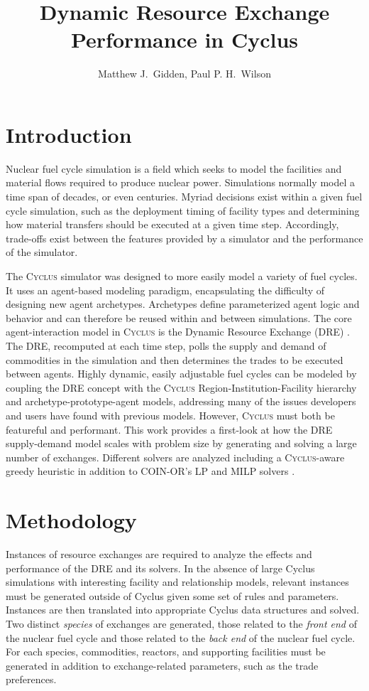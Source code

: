 \documentclass{anstrans}
\title{Dynamic Resource Exchange Performance in Cyclus}
\author{Matthew J.~Gidden, Paul P. H.~Wilson}
\institute{
University of Wisconsin, Madison WI
}
\newcommand{\Cyclus}{\textsc{Cyclus}}
\begin{document}
\section{Introduction}

Nuclear fuel cycle simulation is a field which seeks to model the facilities and
material flows required to produce nuclear power. Simulations normally model a
time span of decades, or even centuries. Myriad decisions exist within a given
fuel cycle simulation, such as the deployment timing of facility types and
determining how material transfers should be executed at a given time
step. Accordingly, trade-offs exist between the features provided by a simulator
and the performance of the simulator.

The \Cyclus{} simulator \cite{cyclus2014} was designed to more easily model a
variety of fuel cycles. It uses an agent-based modeling paradigm, encapsulating
the difficulty of designing new agent archetypes. Archetypes define
parameterized agent logic and behavior and can therefore be reused within and
between simulations. The core agent-interaction model in \Cyclus{} is the
Dynamic Resource Exchange (DRE) \cite{gidden_agent-based_2013,
  gidden_agent-based_2014}. The DRE, recomputed at each time step, polls the
supply and demand of commodities in the simulation and then determines the
trades to be executed between agents. Highly dynamic, easily adjustable fuel
cycles can be modeled by coupling the DRE concept with the \Cyclus{}
Region-Institution-Facility hierarchy and archetype-prototype-agent models,
addressing many of the issues developers and users have found with previous
models. However, \Cyclus{} must both be featureful and performant. This work
provides a first-look at how the DRE supply-demand model scales with problem
size by generating and solving a large number of exchanges. Different solvers
are analyzed including a \Cyclus{}-aware greedy heuristic in addition to
COIN-OR's LP and MILP solvers \cite{coinclp, coincbc}.

\section{Methodology}

Instances of resource exchanges are required to analyze the effects and
performance of the DRE and its solvers. In the absence of large Cyclus
simulations with interesting facility and relationship models, relevant
instances must be generated outside of Cyclus given some set of rules and
parameters. Instances are then translated into appropriate Cyclus data
structures and solved. Two distinct \textit{species} of exchanges are generated,
those related to the \textit{front end} of the nuclear fuel cycle and those
related to the \textit{back end} of the nuclear fuel cycle. For each species,
commodities, reactors, and supporting facilities must be generated in addition
to exchange-related parameters, such as the trade preferences.
\end{document}
